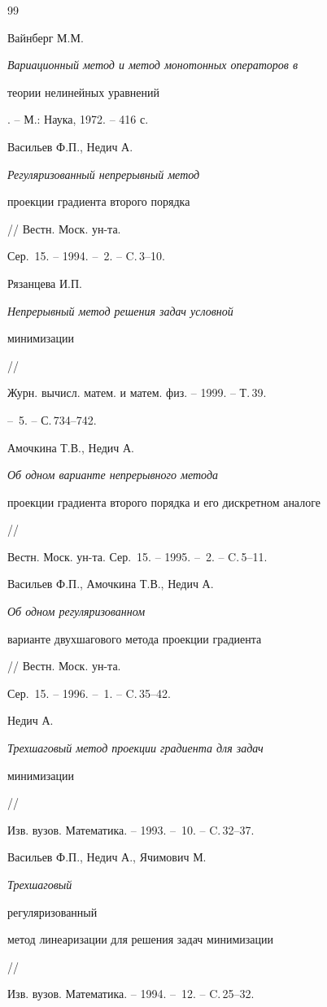 \begin{thebibliography}{99}







Вайнберг М.М. {\em Вариационный метод и метод монотонных операторов в


 теории нелинейных уравнений}. -- М.: Наука, 1972. -- 416 с.




Васильев Ф.П., Недич А. {\em Регуляризованный непрерывный метод


проекции градиента второго порядка} // Вестн. Моск. ун-та.


Сер.~15. -- 1994. -- \No\,2. -- C.\,3--10.




Рязанцева И.П. {\em Непрерывный метод решения задач условной


минимизации} //


Журн. вычисл. матем. и матем. физ. -- 1999. -- Т.\,39.


-- \No\,5. -- С.\,734--742.




Амочкина Т.В., Недич А. {\em Об одном варианте непрерывного метода


проекции градиента второго порядка и его дискретном аналоге} //


Вестн. Моск. ун-та. Сер.~15. -- 1995. -- \No\,2. -- C.\,5--11.


 Васильев Ф.П., Амочкина Т.В., Недич А.


{\em Об одном регуляризованном


варианте двухшагового метода проекции градиента} // Вестн. Моск. ун-та.


Сер.~15. -- 1996. -- \No\,1. -- C.\,35--42.




Недич А. {\em Трехшаговый метод проекции градиента для задач


минимизации} //


 Изв. вузов. Математика. -- 1993. -- \No\,10. -- C.\,32--37.




Васильев Ф.П., Недич А., Ячимович М. {\em Трехшаговый


регуляризованный


метод линеаризации для решения задач минимизации}//


Изв. вузов. Математика. -- 1994. -- \No\,12. -- C.\,25--32.



\end{thebibliography}
